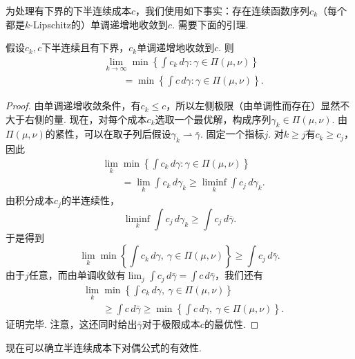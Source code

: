 为处理有下界的下半连续成本$c$，我们使用如下事实：存在连续函数序列$c_k$（每个都是$k$-Lipschitz的）单调递增地收敛到$c$. 需要下面的引理.

\begin{lemma}\label{obj:1.41}
假设$c_k,c$下半连续且有下界，$c_k$单调递增地收敛到$c$. 则
\begin{equation*}
\begin{aligned}
&\lim_{k\to\infty}\min\left\{\int c_k\,d\gamma:\gamma\in\Pi(\mu,\nu)\right\}\\
&\qquad=\min\left\{\int c\,d\gamma:\gamma\in\Pi(\mu,\nu)\right\}.
\end{aligned}
\end{equation*}
\end{lemma}
\begin{proof}
由单调递增收敛条件，有$c_k\le c$，所以左侧极限（由单调性而存在）显然不大于右侧的量. 现在，对每个成本$c_k$选取一个最优解，构成序列$\gamma_k\in\Pi(\mu,\nu)$. 由$\Pi(\mu,\nu)$的紧性，可以在取子列后假设$\gamma_k\rightharpoonup\bar\gamma$. 固定一个指标$j$. 对$k\ge j$有$c_k\ge c_j$，因此
\begin{equation*}
\begin{aligned}
&\lim_k\min\left\{\int c_k\,d\gamma:\gamma\in\Pi(\mu,\nu)\right\}\\
&\qquad=\lim_k\int c_k\,d\gamma_k
\ge\liminf_k\int c_j\,d\gamma_k.
\end{aligned}
\end{equation*}
由积分成本$c_j$的半连续性，
\[
\liminf_k\int c_j\,d\gamma_k\ge\int c_j\,d\bar\gamma.
\]
于是得到
\[
\lim_k\min\left\{\int c_k\,d\gamma,\ \gamma\in\Pi(\mu,\nu)\right\}
\ge\int c_j\,d\bar\gamma.
\]
由于$j$任意，而由单调收敛有$\lim_j\int c_j\,d\bar\gamma=\int c\,d\bar\gamma$，我们还有
\begin{equation*}
\begin{aligned}
&\lim_k\min\left\{\int c_k\,d\gamma,\ \gamma\in\Pi(\mu,\nu)\right\}\\
&\qquad\ge\int c\,d\bar\gamma
\ge\min\left\{\int c\,d\gamma,\ \gamma\in\Pi(\mu,\nu)\right\}.
\end{aligned}
\end{equation*}
证明完毕. 注意，这还同时给出$\bar\gamma$对于极限成本$c$的最优性.
\end{proof}

现在可以确立半连续成本下对偶公式的有效性.

